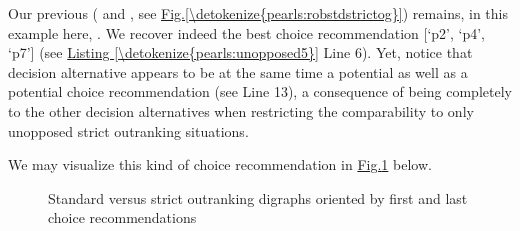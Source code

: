 \documentclass[a4paper,12pt,english]{sphinxhowto}
\let\sphinxpxdimen\pdfpxdimen\else\newdimen\sphinxpxdimen
\begin{document}
\sphinxAtStartPar
Our previous  ( and , see \hyperref[\detokenize{pearls:robstdstrictog}]{Fig.\@ \ref{\detokenize{pearls:robstdstrictog}}}) remains, in this example here, . We recover indeed the best choice recommendation {[}‘p2’, ‘p4’, ‘p7’{]} (see \hyperref[\detokenize{pearls:unopposed5}]{Listing \ref{\detokenize{pearls:unopposed5}}} Line 6). Yet, notice that decision alternative  appears to be at the same time a potential  as well as a potential  choice recommendation (see Line 13), a consequence of  being completely  to the other decision alternatives when restricting the comparability to only unopposed strict outranking situations.

\sphinxAtStartPar
We may visualize this kind of  choice recommendation in \hyperref[\detokenize{pearls:unopdigraph}]{Fig.\@ \ref{\detokenize{pearls:unopdigraph}}} below.

\begin{sphinxVerbatim}[commandchars=\\\{\},numbers=left,firstnumber=1,stepnumber=1]
  
               \PYG{p}{[} \PYG{p}{]}
               \PYG{p}{[}  \PYG{p}{]}
\end{sphinxVerbatim}

\begin{figure}[H]
\centering
\capstart

\noindent\sphinxincludegraphics[width=600\sphinxpxdimen]{{unopDigraph}.png}
\caption{Standard versus  strict outranking digraphs oriented by first and last choice recommendations}\label{\detokenize{pearls:unopdigraph}}\end{figure}
\end{document}
